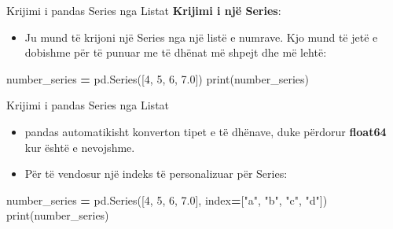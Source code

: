 \documentclass[
  ignorenonframetext,
]{beamer}
\newenvironment{Shaded}{\begin{snugshade}}{\end{snugshade}}
\newcommand{\BuiltInTok}[1]{#1}
\newcommand{\DecValTok}[1]{\textcolor[rgb]{0.00,0.00,0.81}{#1}}
\newcommand{\FloatTok}[1]{\textcolor[rgb]{0.00,0.00,0.81}{#1}}
\newcommand{\NormalTok}[1]{#1}
\newcommand{\OperatorTok}[1]{\textcolor[rgb]{0.81,0.36,0.00}{\textbf{#1}}}
\newcommand{\StringTok}[1]{\textcolor[rgb]{0.31,0.60,0.02}{#1}}
\providecommand{\tightlist}{%
  \setlength{\itemsep}{0pt}\setlength{\parskip}{0pt}}
\begin{document}
\begin{frame}[fragile]{Krijimi i pandas Series nga Listat}
\protect\hypertarget{krijimi-i-pandas-series-nga-listat}{}
\textbf{Krijimi i një Series}:

\begin{itemize}
\tightlist
\item
  Ju mund të krijoni një Series nga një listë e numrave. Kjo mund të
  jetë e dobishme për të punuar me të dhënat më shpejt dhe më lehtë:
\end{itemize}

\begin{Shaded}
\begin{Highlighting}[]
\NormalTok{    number\_series }\OperatorTok{=}\NormalTok{ pd.Series([}\DecValTok{4}\NormalTok{, }\DecValTok{5}\NormalTok{, }\DecValTok{6}\NormalTok{, }\FloatTok{7.0}\NormalTok{])}
    \BuiltInTok{print}\NormalTok{(number\_series)}
\end{Highlighting}
\end{Shaded}
\end{frame}

\begin{frame}[fragile]{Krijimi i pandas Series nga Listat}
\protect\hypertarget{krijimi-i-pandas-series-nga-listat-1}{}
\begin{itemize}
\item
  pandas automatikisht konverton tipet e të dhënave, duke përdorur
  \textbf{float64} kur është e nevojshme.
\item
  Për të vendosur një indeks të personalizuar për Series:
\end{itemize}

\begin{Shaded}
\begin{Highlighting}[]
\NormalTok{    number\_series }\OperatorTok{=}\NormalTok{ pd.Series([}\DecValTok{4}\NormalTok{, }\DecValTok{5}\NormalTok{, }\DecValTok{6}\NormalTok{, }\FloatTok{7.0}\NormalTok{], index}\OperatorTok{=}\NormalTok{[}\StringTok{"a"}\NormalTok{, }\StringTok{"b"}\NormalTok{, }\StringTok{"c"}\NormalTok{, }\StringTok{"d"}\NormalTok{])}
    \BuiltInTok{print}\NormalTok{(number\_series)}
\end{Highlighting}
\end{Shaded}
\end{frame}
\end{document}
